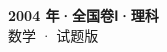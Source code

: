 \documentclass[zihao=-4, a4paper]{ctexart}
\begin{document}
\begin{center}
  {\Large\bfseries 2004 年·全国卷Ⅰ·理科}\\[4pt]
  {\large 数学 · 试题版}
\end{center}
\medskip
{}

\end{document}

